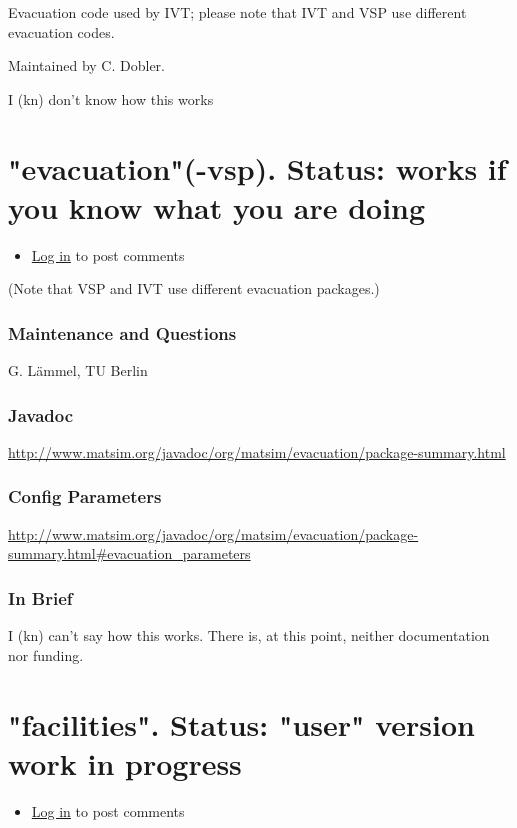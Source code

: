 \documentclass[a4paper,11pt]{report}
\begin{document}
Evacuation code used by IVT; please note that IVT and VSP use different evacuation codes.

Maintained by C. Dobler.

I (kn) don't know how this works

\vfill\eject
\section{"evacuation"(-vsp). Status: works if you know what you are doing}
\begin{itemize}
	\item \href{http://www.matsim.org/user/login?destination=comment/reply/391%23comment-form}{Log in} to post comments
\end{itemize}

(Note that VSP and IVT use different evacuation packages.)

\subsubsection{\textbf{Maintenance and Questions}}

G. Lämmel, TU Berlin

\subsubsection{\textbf{Javadoc}}

\href{http://www.matsim.org/javadoc/org/matsim/evacuation/package-summary.html}{http://www.matsim.org/javadoc/org/matsim/evacuation/package-summary.html}


\subsubsection{\textbf{\textbf{Config Parameters{}}}}

\href{http://www.matsim.org/javadoc/org/matsim/evacuation/package-summary.html#evacuation_parameters}{http://www.matsim.org/javadoc/org/matsim/evacuation/package-summary.html\#evacuation\_parameters}

\subsubsection{\textbf{\textbf{In Brief}}}

I (kn) can't say how this works. There is, at this point, neither documentation nor funding.

\vfill\eject
\section{"facilities". Status: "user" version work in progress}
\begin{itemize}
	\item \href{http://www.matsim.org/user/login?destination=comment/reply/393%23comment-form}{Log in} to post comments
\end{itemize}
\end{document}
